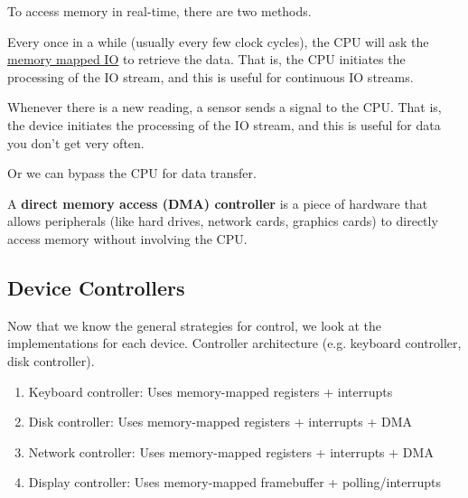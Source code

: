   To access memory in real-time, there are two methods. 

  \begin{definition}[Polling]
    \label{def:polling}
    Every once in a while (usually every few clock cycles), the CPU will ask the \hyperref[def:memory-mapped-io]{memory mapped IO} to retrieve the data. That is, the CPU initiates the processing of the IO stream, and this is useful for continuous IO streams. 
  \end{definition}

  \begin{definition}[Interrupts]
    \label{def:interrupts}
    Whenever there is a new reading, a sensor sends a signal to the CPU. That is, the device initiates the processing of the IO stream, and this is useful for data you don't get very often. 
  \end{definition}

  Or we can bypass the CPU for data transfer. 

  \begin{definition}
    \label{def:direct-memory-access}
    A \textbf{direct memory access (DMA) controller} is a piece of hardware that allows peripherals (like hard drives, network cards, graphics cards) to directly access memory without involving the CPU. 
  \end{definition}

  \begin{example}
    \label{ex:control-strategies}
    
  \end{example}

\subsection{Device Controllers}

  Now that we know the general strategies for control, we look at the implementations for each device. Controller architecture (e.g. keyboard controller, disk controller). 
  \begin{enumerate}
    \item Keyboard controller: Uses memory-mapped registers + interrupts
    \item Disk controller: Uses memory-mapped registers + interrupts + DMA
    \item Network controller: Uses memory-mapped registers + interrupts + DMA
    \item Display controller: Uses memory-mapped framebuffer + polling/interrupts
  \end{enumerate}

